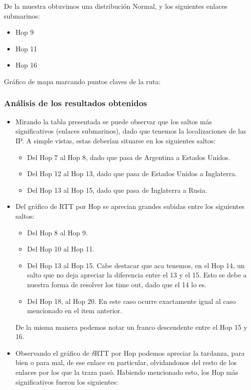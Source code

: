 \cleardoublepage

De la muestra obtuvimos una distribuci\'on Normal, y los siguientes enlaces submarinos:
\begin{itemize}
\item Hop 9
\item Hop 11
\item Hop 16
\end{itemize}

Gr\'afico de mapa marcando puntos claves de la ruta:

\subsubsection{An\'alisis de los resultados obtenidos}
\begin{itemize}
\item Mirando la tabla presentada se puede observar que los saltos m\'as significativos (enlaces submarinos), dado que tenemos la localizaciones de las IP. A simple vistas, estas deber\'ian situarse en los siguientes saltos:
\begin{itemize}
\item Del Hop 7 al Hop 8, dado que pasa de Argentina a Estados Unidos.
\item Del Hop 12 al Hop 13, dado que pasa de Estados Unidos a Inglaterra.
\item Del Hop 13 al Hop 15, dado que pasa de Inglaterra a Rusia.
\end{itemize}
\item Del gr\'afico de RTT por Hop se aprecian grandes subidas entre los siguientes saltos:
\begin{itemize}
\item Del Hop 8 al Hop 9.
\item Del Hop 10 al Hop 11.
\item Del Hop 13 al Hop 15. Cabe destacar que aca tenemos, en el Hop 14, un salto que no deja apreciar la diferencia entre el 13 y el 15. Esto se debe a nuestra forma de resolver los time out, dado que el 14 lo es.
\item Del Hop 18, al Hop 20. En este caso ocurre exactamente igual al caso mencionado en el item anterior.
\end{itemize}
De la misma manera podemos notar un franco descendente entre el Hop 15 y 16.
\item Observando el gr\'afico de $\delta$RTT por Hop podemos apreciar la tardanza, para bien o para mal, de ese enlace en particular, olvidandonos del resto de los enlaces por los que la traza pas\'o. Habiendo mencionado esto, los Hop m\'as significativos fueron los siguientes:

\end{itemize}
